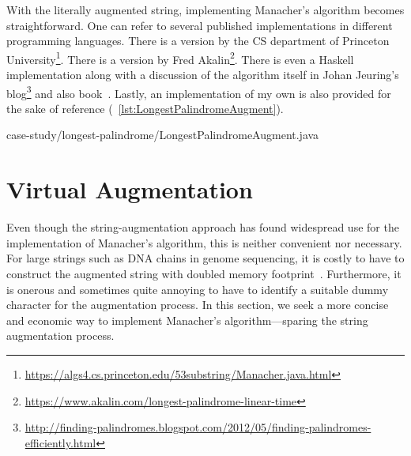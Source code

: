 With the literally augmented string, implementing Manacher's algorithm becomes straightforward.
One can refer to several published implementations in different programming languages.
There is a \java version by the CS department of Princeton
University\footnote{\url{https://algs4.cs.princeton.edu/53substring/Manacher.java.html}}.
There is a \python version by Fred
Akalin\footnote{\url{https://www.akalin.com/longest-palindrome-linear-time}}.
There is even a Haskell implementation along with a discussion of the algorithm itself
in Johan Jeuring's blog\footnote{
\url{http://finding-palindromes.blogspot.com/2012/05/finding-palindromes-efficiently.html}} and
also book~\cite{jeuring1993theories}.
Lastly, an implementation of my own is also provided for the sake of reference
(~\autoref{lst:LongestPalindromeAugment}).

\begin{clisting}[H]
    
    {case-study/longest-palindrome/LongestPalindromeAugment.java}
\end{clisting}


\section{Virtual Augmentation}\label{sec:virtualMapping}

Even though the string-augmentation approach has found widespread use for
the implementation of Manacher's algorithm, this is neither convenient nor necessary.
For large strings such as DNA chains in genome sequencing, it is costly to have to
construct the augmented string with doubled memory footprint~\cite{shiu2010data}.
Furthermore, it is onerous and sometimes quite annoying to have to identify a suitable dummy
character for the augmentation process.
In this section, we seek a more concise and economic way to
implement Manacher's algorithm---sparing the string augmentation process.


